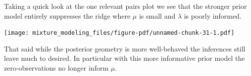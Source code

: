 \documentclass[
  letterpaper,
  DIV=11,
  numbers=noendperiod]{scrartcl}
\newenvironment{Shaded}{\begin{snugshade}}{\end{snugshade}}
\newcommand{\AttributeTok}[1]{\textcolor[rgb]{0.40,0.45,0.13}{#1}}
\newcommand{\DecValTok}[1]{\textcolor[rgb]{0.68,0.00,0.00}{#1}}
\newcommand{\FunctionTok}[1]{\textcolor[rgb]{0.28,0.35,0.67}{#1}}
\newcommand{\NormalTok}[1]{\textcolor[rgb]{0.00,0.23,0.31}{#1}}
\newcommand{\SpecialCharTok}[1]{\textcolor[rgb]{0.37,0.37,0.37}{#1}}
\newcommand{\StringTok}[1]{\textcolor[rgb]{0.13,0.47,0.30}{#1}}
\begin{document}
Taking a quick look at the one relevant pairs plot we see that the
stronger prior model entirely suppresses the ridge where \(\mu\) is
small and \(\lambda\) is poorly informed.

\begin{Shaded}
\end{Shaded}

\texttt{[image: mixture\_modeling\_files/figure-pdf/unnamed-chunk-31-1.pdf]}

That said while the posterior geometry is more well-behaved the
inferences still leave much to desired. In particular with this more
informative prior model the zero-observations no longer inform \(\mu\).

\begin{Shaded}
\end{Shaded}
\end{document}
